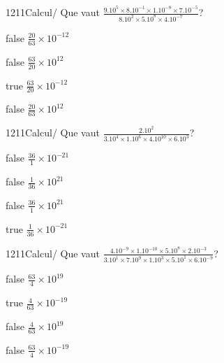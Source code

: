 \documentclass[11pt]{article}
\begin{document}
            \begin{question}{1211}{Calcul}{}{/}
                Que vaut $\frac{9.10^{5}\times 8.10^{-1}\times 1.10^{-8}\times 7.10^{-5}}{8.10^{2}\times 5.10^{8}\times 4.10^{-7}}$?
            \end{question}
            
            \begin{reponses}
                \item[false] $\frac{20}{63}\times 10^{-12}$
                \item[false] $\frac{63}{20}\times 10^{12}$
                \item[true] $\frac{63}{20}\times 10^{-12}$
                \item[false] $\frac{20}{63}\times 10^{12}$
            \end{reponses}
            
            \begin{question}{1211}{Calcul}{}{/}
                Que vaut $\frac{2.10^{2}}{3.10^{4}\times 1.10^{6}\times 4.10^{10}\times 6.10^{3}}$?
            \end{question}
            
            \begin{reponses}
                \item[false] $\frac{36}{1}\times 10^{-21}$
                \item[false] $\frac{1}{36}\times 10^{21}$
                \item[false] $\frac{36}{1}\times 10^{21}$
                \item[true] $\frac{1}{36}\times 10^{-21}$
            \end{reponses}
            
            \begin{question}{1211}{Calcul}{}{/}
                Que vaut $\frac{4.10^{-9}\times 1.10^{-10}\times 5.10^{8}\times 2.10^{-3}}{3.10^{1}\times 7.10^{9}\times 1.10^{3}\times 5.10^{1}\times 6.10^{-9}}$?
            \end{question}
            
            \begin{reponses}
                \item[false] $\frac{63}{4}\times 10^{19}$
                \item[true] $\frac{4}{63}\times 10^{-19}$
                \item[false] $\frac{4}{63}\times 10^{19}$
                \item[false] $\frac{63}{4}\times 10^{-19}$
            \end{reponses}
            
\end{document}
